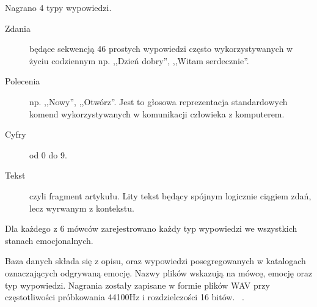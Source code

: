 \documentclass[a4paper,12pt,twoside,openany]{report}
\begin{document}
Nagrano 4 typy wypowiedzi.
\begin{description}
	\item [Zdania] będące sekwencją 46 prostych wypowiedzi często wykorzystywanych w życiu codziennym 
		np. ,,Dzień dobry'', ,,Witam serdecznie''. 
	\item [Polecenia]  np. ,,Nowy'', ,,Otwórz''. 
		Jest to głosowa reprezentacja standardowych komend wykorzystywanych w komunikacji człowieka z komputerem.
	\item [Cyfry] od 0 do 9.
	\item [Tekst] czyli fragment artykułu. 
		Lity tekst będący spójnym logicznie ciągiem zdań, lecz wyrwanym z kontekstu.
\end{description}
Dla każdego z 6 mówców zarejestrowano każdy typ wypowiedzi we wszystkich stanach emocjonalnych.

Baza danych składa się z opisu, oraz wypowiedzi posegregowanych w katalogach oznaczających odgrywaną emocję.
Nazwy plików wskazują na mówcę, emocję oraz typ wypowiedzi.
Nagrania zostały zapisane w formie plików WAV przy częstotliwości próbkowania 44100Hz i rozdzielczości 16 bitów. ~\cite{Igras2009}.
\end{document}
